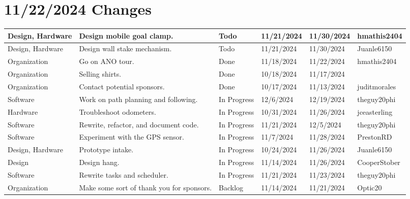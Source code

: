 \section{11/22/2024 Changes}
\begin{center}
\begin{longtable}{| p{40pt} | p{150pt} | p{35pt} | p{33pt} | p{33pt} | p{40pt} |}
\hline \rowcolor{IndianRed1}
Design, Hardware & Design mobile goal clamp. & Todo & 11/21/2024 & 11/30/2024 & hmathis2404 \\
\hline \rowcolor{IndianRed1}
Design, Hardware & Design wall stake mechanism. & Todo & 11/21/2024 & 11/30/2024 & Juanle6150 \\
\hline \rowcolor{DarkSeaGreen1}
Organization & Go on ANO tour. & Done & 11/18/2024 & 11/22/2024 & hmathis2404 \\
\hline \rowcolor{DarkSeaGreen1}
Organization & Selling shirts. & Done & 10/18/2024 & 11/17/2024 & \\
\hline \rowcolor{DarkSeaGreen1}
Organization & Contact potential sponsors. & Done & 10/17/2024 & 11/13/2024 & juditmorales \\
\hline \rowcolor{LightGoldenrod1}
Software & Work on path planning and following. & In Progress & 12/6/2024 & 12/19/2024 & theguy20phi \\
\hline \rowcolor{LightGoldenrod1}
Hardware & Troubleshoot odometers. & In Progress & 10/31/2024 & 11/26/2024 & jceasterling \\
\hline \rowcolor{LightGoldenrod1}
Software & Rewrite, refactor, and document code. & In Progress & 11/21/2024 & 12/5/2024 & theguy20phi \\
\hline \rowcolor{LightGoldenrod1}
Software & Experiment with the GPS sensor. & In Progress & 11/7/2024 & 11/28/2024 & PrestonRD \\
\hline \rowcolor{LightGoldenrod1}
Design, Hardware & Prototype intake. & In Progress & 10/24/2024 & 11/26/2024 & Juanle6150 \\
\hline \rowcolor{LightGoldenrod1}
Design & Design hang. & In Progress & 11/14/2024 & 11/26/2024 & CooperStober \\
\hline \rowcolor{LightGoldenrod1}
Software & Rewrite tasks and scheduler. & In Progress & 11/21/2024 & 11/23/2024 & theguy20phi \\
\hline \rowcolor{Ivory2}
Organization & Make some sort of thank you for sponsors. & Backlog & 11/14/2024 & 11/21/2024 & Optic20 \\
\hline
\end{longtable}
\end{center}


